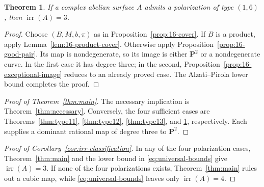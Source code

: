 \documentclass[12pt]{amsart}
\numberwithin{equation}{section}
\newtheorem{theorem}{Theorem}[section]
\theoremstyle{definition}
\theoremstyle{remark}
\newcommand{\PP}{\mathbf P}
\newcommand{\irr}{\operatorname{irr}}
\begin{document}


\begin{theorem}\label{thm:type16}
If a complex abelian surface $A$ admits a polarization of type $(1,6)$,
then $\irr(A)=3$.
\end{theorem}

\begin{proof}
Choose $(B,M,b,\pi)$ as in Proposition~\ref{prop:16-cover}.  If $B$ is
a product, apply Lemma~\ref{lem:16-product-cover}.  Otherwise apply
Proposition~\ref{prop:16-good-pair}.  Its map is nondegenerate, so its
image is either $\PP^2$ or a nondegenerate curve.  In the first
case it has degree three; in the second,
Proposition~\ref{prop:16-exceptional-image} reduces to an already proved
case.  The Alzati--Pirola lower bound completes the proof.
\end{proof}

\begin{proof}[Proof of Theorem~\ref{thm:main}]
The necessary implication is Theorem~\ref{thm:necessary}.  Conversely,
the four sufficient cases are Theorems~\ref{thm:type11},
\ref{thm:type12}, \ref{thm:type13}, and \ref{thm:type16}, respectively.
Each supplies a dominant rational map of degree three to $\PP^2$.
\end{proof}

\begin{proof}[Proof of Corollary~\ref{cor:irr-classification}]
In any of the four polarization cases, Theorem~\ref{thm:main} and the
lower bound in \eqref{eq:universal-bounds} give $\irr(A)=3$.  If none of
the four polarizations exists, Theorem~\ref{thm:main} rules out a cubic
map, while \eqref{eq:universal-bounds} leaves only $\irr(A)=4$.
\end{proof}
\end{document}
